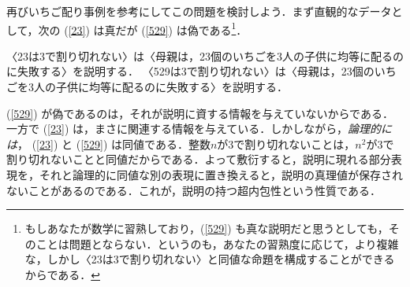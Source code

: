\documentclass[dvipdfmx,twoside,11pt,uplatex]{jsarticle}
\theoremstyle{definition}
\begin{document}
再びいちご配り事例を参考にしてこの問題を検討しよう．まず直観的なデータとして，次の (\ref{23}) は真だが (\ref{529}) は偽である\footnote{
もしあなたが数学に習熟しており，(\ref{529}) も真な説明だと思うとしても，そのことは問題とならない．というのも，あなたの習熟度に応じて，より複雑な，しかし〈23は3で割り切れない〉と同値な命題を構成することができるからである．
}．
\begin{exe}
    \ex 
    \begin{xlist}
        \ex 〈23は3で割り切れない〉は〈母親は，23個のいちごを3人の子供に均等に配るのに失敗する〉を説明する．\label{23}
        \ex 〈529は3で割り切れない〉は〈母親は，23個のいちごを3人の子供に均等に配るのに失敗する〉を説明する．\label{529}
    \end{xlist}
\end{exe}
(\ref{529}) が偽であるのは，それが説明に資する情報を与えていないからである．一方で (\ref{23}) は，まさに関連する情報を与えている．しかしながら，\emph{論理的には}， (\ref{23}) と (\ref{529}) は同値である．整数$n$が3で割り切れないことは，$n^{2}$が3で割り切れないことと同値だからである．よって敷衍すると，説明に現れる部分表現を，それと論理的に同値な別の表現に置き換えると，説明の真理値が保存されないことがあるのである．これが，説明の持つ超内包性という性質である．
\end{document}
